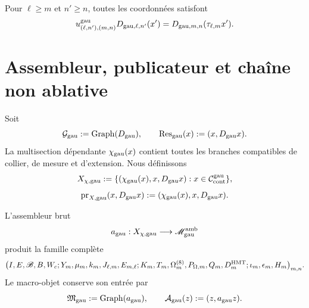 Pour \(\ell\ge m\) et \(n'\ge n\), toutes les coordonnées satisfont
\begin{equation}\label{eq:gauint-naturalidad-trece}
 u^{\rm gau}_{(\ell,n'),(m,n)}D_{{\rm gau},\ell,n'}(x')
 =D_{{\rm gau},m,n}(\tau_{\ell,m}x').
\end{equation}

\section{Assembleur, publicateur et chaîne non ablative}

Soit
\begin{equation}\label{eq:gauint-graph-d}
 \mathcal G_{\rm gau}:=\operatorname{Graph}(D_{\rm gau}),
 \qquad
 \operatorname{Res}_{\rm gau}(x):=(x,D_{\rm gau}x).
\end{equation}
La multisection dépendante \(\chi_{\rm gau}(x)\) contient toutes les branches
compatibles de collier, de mesure et d'extension. Nous définissons
\begin{equation}\label{eq:gauint-x-dependiente}
 X_{\chi,{\rm gau}}
 :=\{(\chi_{\rm gau}(x),x,D_{\rm gau}x):
 x\in\mathcal C_{\rm cont}^{\rm gau}\},
\end{equation}
\begin{equation}\label{eq:gauint-prx}
 \operatorname{pr}_{X,{\rm gau}}(x,D_{\rm gau}x)
 :=(\chi_{\rm gau}(x),x,D_{\rm gau}x).
\end{equation}

L'assembleur brut
\begin{equation}\label{eq:gauint-ensamblador-crudo}
 a_{\rm gau}:X_{\chi,{\rm gau}}\longrightarrow
 \mathscr M_{\rm gau}^{\rm amb}
\end{equation}
produit la famille complète
\[
 \bigl(I,E,\mathscr B,B,W_c;
 Y_m,\mu_m,k_m,J_{\ell,m},E_{m,\ell};
 K_m,T_m,\Omega_m^{(8)},P_{\Omega,m},Q_m,D_m^{\rm HMT};
 \iota_m,\epsilon_m,H_m\bigr)_{m,n}.
\]
Le macro-objet conserve son entrée par
\begin{equation}\label{eq:gauint-graph-a}
 \mathfrak M_{\rm gau}:=\operatorname{Graph}(a_{\rm gau}),
 \qquad
 \mathcal A_{\rm gau}(z):=(z,a_{\rm gau}z).
\end{equation}

